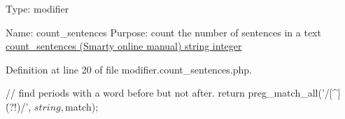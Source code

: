 \-Type\-: modifier\par
 \-Name\-: count\-\_\-sentences \-Purpose\-: count the number of sentences in a text \hyperlink{}{count\-\_\-sentences (\-Smarty online manual)  string  integer }

\-Definition at line 20 of file modifier.\-count\-\_\-sentences.\-php.


\begin{DoxyCode}
{
    // find periods with a word before but not after.
    return preg_match_all('/[^\s]\.(?!\w)/', $string, $match);
}
\end{DoxyCode}
